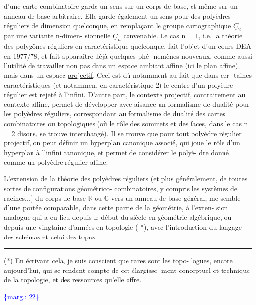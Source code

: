 \documentclass[11pt]{article}
\newcommand{\scanpage}[1]{\par\bigskip\noindent{\small\sffamily[scan #1]}\par}
\newcommand{\mspage}[1]{{\small\sffamily[p.\,#1]}}
\newcommand{\margin}[1]{\textcolor{blue}{\{\textsf{marg.:} #1\}}}
\newcommand{\uline}[1]{\underline{#1}}
\begin{document}
d'une carte combinatoire garde un sens sur un corps de base, et
même sur un anneau de base arbitraire. Elle garde également un
sens pour des polyèdres réguliers de dimension quelconque, en
remplaçant le groupe cartographique $\underline{C}_2$ par une variante n-dimen-%
sionnelle $\underline{C}_n$ convenable. Le cas n = 1, i.e. la théorie des
polygônes réguliers en caractéristique quelconque, fait l'objet
d'un cours DEA en 1977/78, et fait apparaître déjà quelques phé-%
nomènes nouveaux, comme aussi l'utilité de travailler non pas
dans un espace ambiant affine (ici le plan affine), mais dans
un espace \uline{projectif}. Ceci est dû notamment au fait que dans cer-%
taines caractéristiques (et notamment en caractéristique 2) le
centre d'un polyèdre régulier est rejeté à l'infini. D'autre
part, le contexte projectif, contrairement au contexte affine,
permet de développer avec aisance un formalisme de dualité pour
les polyèdres réguliers, correspondant au formalisme de dualité
des cartes combinatoires ou topologiques (où le rôle des sommets
et des faces, dans le cas n = 2 disons, se trouve interchangé).
Il se trouve que pour tout polyèdre régulier projectif, on peut
définir un hyperplan canonique associé, qui joue le rôle d'un
hyperplan à l'infini canonique, et permet de considérer le polyè-%
dre donné comme un polyèdre régulier affine.

L'extension de la théorie des polyèdres réguliers (et
plus généralement, de toutes sortes de configurations géométrico-%
combinatoires, y compris les systèmes de racines...) du corps de
base $\mathbb{R}$ ou $\mathbb{C}$ vers un anneau de base général, me semble d'une
portée comparable, dans cette partie de la géométrie, à l'exten-%
sion analogue qui a eu lieu depuis le début du siècle en géométrie
algébrique, ou depuis une vingtaine d'années en topologie ( *),
avec l'introduction du langage des schémas et celui des topos.

\rule{4cm}{0.4pt}

(*) En écrivant cela, je suis conscient que rares sont les topo-%
logues, encore aujourd'hui, qui se rendent compte de cet élargisse-%
ment conceptuel et technique de la topologie, et des ressources
qu'elle offre.

\margin{22}

\clearpage
\scanpage{119/23}
\mspage{21}
\end{document}
